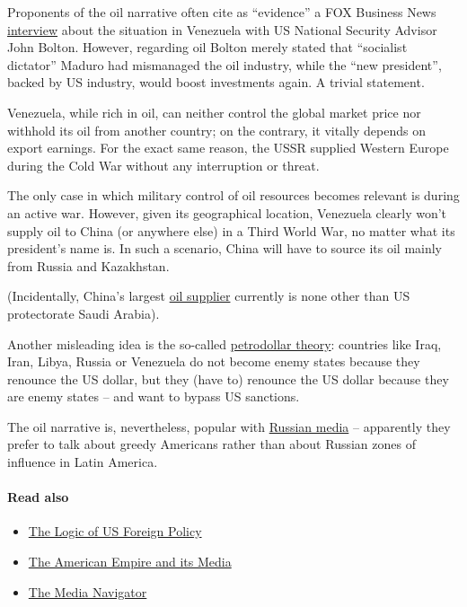 Proponents of the oil narrative often cite as ``evidence'' a FOX
Business News
\href{https://www.youtube.com/watch?v=8av-cPP1uPE}{interview} about the
situation in Venezuela with US National Security Advisor John Bolton.
However, regarding oil Bolton merely stated that ``socialist dictator''
Maduro had mismanaged the oil industry, while the ``new president'',
backed by US industry, would boost investments again. A trivial
statement.

Venezuela, while rich in oil, can neither control the global market
price nor withhold its oil from another country; on the contrary, it
vitally depends on export earnings. For the exact same reason, the USSR
supplied Western Europe during the Cold War without any interruption or
threat.

The only case in which military control of oil resources becomes
relevant is during an active war. However, given its geographical
location, Venezuela clearly won't supply oil to China (or anywhere else)
in a Third World War, no matter what its president's name is. In such a
scenario, China will have to source its oil mainly from Russia and
Kazakhstan.

(Incidentally, China's largest
\href{https://oilprice.com/Energy/Crude-Oil/The-Battle-For-Chinas-Oil-Market.html}{oil
supplier} currently is none other than US protectorate Saudi Arabia).

Another misleading idea is the so-called
\href{https://foreignpolicy.com/2009/10/07/debunking-the-dumping-the-dollar-conspiracy/}{petrodollar
theory}: countries like Iraq, Iran, Libya, Russia or Venezuela do not
become enemy states because they renounce the US dollar, but they (have
to) renounce the US dollar because they are enemy states -- and want to
bypass US sanctions.

The oil narrative is, nevertheless, popular with
\href{https://www.rt.com/usa/449982-john-bolton-oil-venezuela/}{Russian
media} -- apparently they prefer to talk about greedy Americans rather
than about Russian zones of influence in Latin America.

\hypertarget{read-also}{%
\paragraph{Read also}\label{read-also}}

\begin{itemize}
\tightlist
\item
  \href{https://swprs.org/us-foreign-policy/}{The Logic of US Foreign
  Policy}
\item
  \href{https://swprs.org/the-american-empire-and-its-media/}{The
  American Empire and its Media}
\item
  \href{https://swprs.org/media-navigator/}{The Media Navigator}
\end{itemize}

